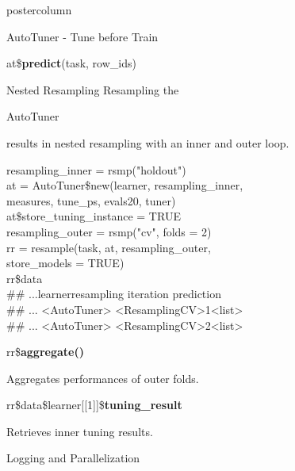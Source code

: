 \documentclass{beamer}
\newcommand{\codeinline}[1]{\begin{codeboxinline}#1\end{codeboxinline}}
\newcommand{\monospace}[1]{\multido{}{#1}{\space}}
\begin{document}
\begin{frame}[fragile]{}
\begin{columns}
\begin{column}{.245\textwidth}
\begin{beamercolorbox}[center]{postercolumn}
\begin{minipage}{.98\textwidth}
{\begin{myblock}{AutoTuner - Tune before Train}
\begin{codeboxmultiline}[width=16.5cm]
								at\$\textbf{predict}(task, row\_ids)
							\end{codeboxmultiline}
						\end{myblock}
						\begin{myblock}{Nested Resampling}
							Resampling the \codeinline{AutoTuner} results in nested resampling with an inner and outer loop.
							\\
							\begin{codeboxexample}
								{\scriptsize
									resampling\_inner = rsmp("holdout")
									\vspace{1em}
									\\
									at = AutoTuner\$new(learner, resampling\_inner, \\
									\hspace*{1ex}measures, tune\_ps, evals20, tuner) \\
									at\$store\_tuning\_instance = TRUE
									\vspace{1em}
									\\
									resampling\_outer = rsmp("cv", folds = 2)\\
									rr = resample(task, at, resampling\_outer, \\
									\hspace*{1ex}store\_models = TRUE)
									\vspace{1em}
									\\
									rr\$data\\
									\#\# ...\monospace{3}learner\monospace{5}resampling iteration
									prediction\\
									\#\# ... <AutoTuner> <ResamplingCV>\monospace{9}1\monospace{5}<list>\\
									\#\# ... <AutoTuner> <ResamplingCV>\monospace{9}2\monospace{5}<list>}
							\end{codeboxexample}
							\vspace{1em}
							\begin{codebox}
								rr\$\textbf{aggregate()}
							\end{codebox}
							Aggregates performances of outer folds.
							\\
							\begin{codebox}
								rr\$data\$learner[[1]]\$\textbf{tuning\_result}
							\end{codebox}
							Retrieves inner tuning results.
							\vspace{-0.5em}
						\end{myblock}
						\begin{myblock}{Logging and Parallelization}

\end{myblock}}
\end{minipage}
\end{beamercolorbox}
\end{column}
\end{columns}
\end{frame}
\end{document}
